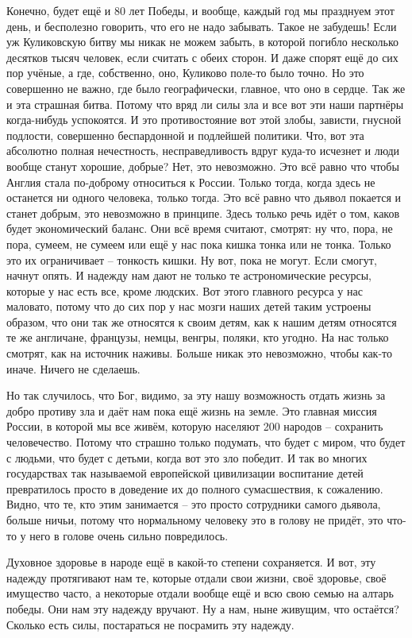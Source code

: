 Конечно, будет ещё и 80 лет Победы, и вообще, каждый год мы празднуем этот
день, и бесполезно говорить, что его не надо забывать. Такое не забудешь! Если
уж Куликовскую битву мы никак не можем забыть, в которой погибло несколько
десятков тысяч человек, если считать с обеих сторон. И даже спорят ещё до сих
пор учёные, а где, собственно, оно, Куликово поле-то было точно. Но это
совершенно не важно, где было географически, главное, что оно в сердце. Так же
и эта страшная битва. Потому что вряд ли силы зла и все вот эти наши партнёры
когда-нибудь успокоятся. И это противостояние вот этой злобы, зависти, гнусной
подлости, совершенно беспардонной и подлейшей политики. Что, вот эта абсолютно
полная нечестность, несправедливость вдруг куда-то исчезнет и люди вообще
станут хорошие, добрые? Нет, это невозможно. Это всё равно что чтобы Англия
стала по-доброму относиться к России. Только тогда, когда здесь не останется ни
одного человека, только тогда. Это всё равно что дьявол покается и станет
добрым, это невозможно в принципе. Здесь только речь идёт о том, каков будет
экономический баланс. Они всё время считают, смотрят: ну что, пора, не пора,
сумеем, не сумеем или ещё у нас пока кишка тонка или не тонка. Только это их
ограничивает – тонкость кишки. Ну вот, пока не могут. Если смогут, начнут
опять. И надежду нам дают не только те астрономические ресурсы, которые у нас
есть все, кроме людских. Вот этого главного ресурса у нас маловато, потому что
до сих пор у нас мозги наших детей таким устроены образом, что они так же
относятся к своим детям, как к нашим детям относятся те же англичане, французы,
немцы, венгры, поляки, кто угодно. На нас только смотрят, как на источник
наживы. Больше никак это невозможно, чтобы как-то иначе. Ничего не сделаешь. 
 
Но так случилось, что Бог, видимо, за эту нашу возможность отдать жизнь за
добро противу зла и даёт нам пока ещё жизнь на земле. Это главная миссия
России, в которой мы все живём, которую населяют 200 народов – сохранить
человечество. Потому что страшно только подумать, что будет с миром, что будет
с людьми, что будет с детьми, когда вот это зло победит. И так во многих
государствах так называемой европейской цивилизации воспитание детей
превратилось просто в доведение их до полного сумасшествия, к сожалению. Видно,
что те, кто этим занимается – это просто сотрудники самого дьявола, больше
ничьи, потому что нормальному человеку это в голову не придёт, это что-то у
него в голове очень сильно повредилось. 
 
Духовное здоровье в народе ещё в какой-то степени сохраняется. И вот, эту
надежду протягивают нам те, которые отдали свои жизни, своё здоровье, своё
имущество часто, а некоторые отдали вообще ещё и всю свою семью на алтарь
победы. Они нам эту надежду вручают. Ну а нам, ныне живущим, что остаётся?
Сколько есть силы, постараться не посрамить эту надежду. 
 
